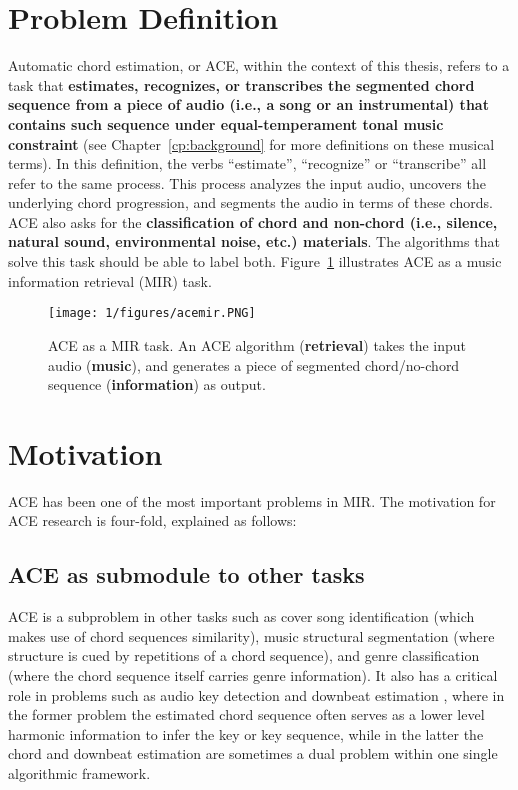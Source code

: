 \section{Problem Definition} \label{sec:1-problemdef}
Automatic chord estimation, or ACE, within the context of this thesis, refers to a task that \textbf{estimates, recognizes, or transcribes the segmented chord sequence from a piece of audio (i.e., a song or an instrumental) that contains such sequence under equal-temperament tonal music constraint} (see Chapter~\ref{cp:background} for more definitions on these musical terms). In this definition, the verbs ``estimate'', ``recognize'' or ``transcribe'' all refer to the same process. This process analyzes the input audio, uncovers the underlying chord progression, and segments the audio in terms of these chords. ACE also asks for the \textbf{classification of chord and non-chord (i.e., silence, natural sound, environmental noise, etc.) materials}. The algorithms that solve this task should be able to label both. Figure~\ref{fig:1-acemir} illustrates ACE as a music information retrieval (MIR) task.
\begin{figure}[h]
\centering
\texttt{[image: 1/figures/acemir.PNG]}
\caption{ACE as a MIR task. An ACE algorithm (\textbf{retrieval}) takes the input audio (\textbf{music}), and generates a piece of segmented chord/no-chord sequence (\textbf{information}) as output.}
\label{fig:1-acemir}
\end{figure}

\section{Motivation} \label{sec:1-moti}
ACE has been one of the most important problems in MIR. The motivation for ACE research is four-fold, explained as follows:

\subsection{ACE as submodule to other tasks}
ACE is a subproblem in other tasks such as cover song identification \cite{bello2007audio,lee2006identifying,serra2010audio} (which makes use of chord sequences similarity), music structural segmentation \cite{bello2005robust} (where structure is cued by repetitions of a chord sequence), and genre classification \cite{cheng2008automatic,perez2009genre} (where the chord sequence itself carries genre information). It also has a critical role in problems such as audio key detection \cite{papadopoulos2012modeling,pauwels2010integrating} and downbeat estimation \cite{papadopoulos2008simultaneous,mauch2010simultaneous}, where in the former problem the estimated chord sequence often serves as a lower level harmonic information to infer the key or key sequence, while in the latter the chord and downbeat estimation are sometimes a dual problem within one single algorithmic framework.

